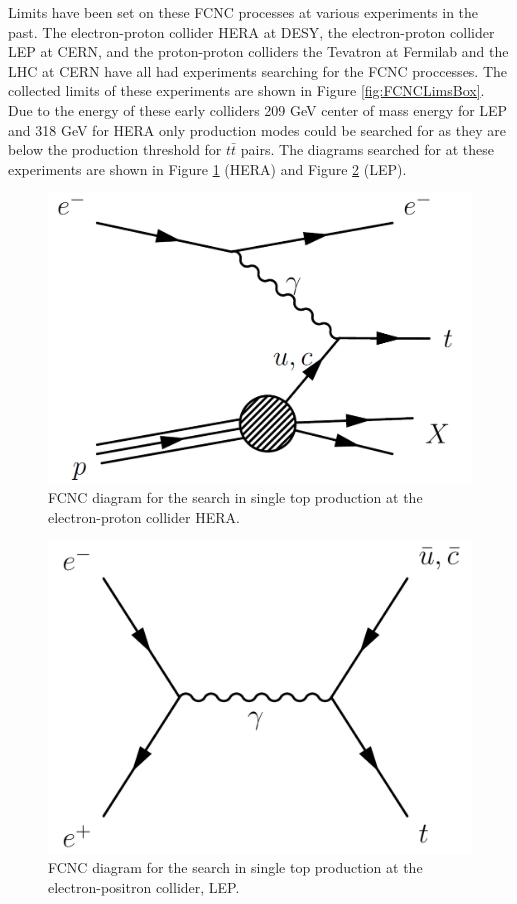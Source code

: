 Limits have been set on these FCNC processes at various experiments in the past.  The electron-proton collider HERA at DESY, the electron-proton collider LEP at CERN, and the proton-proton colliders the Tevatron at Fermilab and the LHC at CERN have all had experiments searching for the FCNC proccesses.  The collected limits of these experiments are shown in Figure \ref{fig:FCNCLimsBox}.  Due to the energy of these early colliders 209 GeV center of mass energy for LEP and 318 GeV for HERA only production modes could be searched for as they are below the production threshold for $t\bar{t}$ pairs. The diagrams searched for at these experiments are shown in Figure \ref{fig:fcncHera} (HERA) and Figure \ref{fig:fcncLep} (LEP).
\begin{figure}[h!]
	\centering
	\includegraphics[width=.4\columnwidth]{../ThesisImages/Theory/HeraFCNC.png}
	\caption{FCNC diagram for the search in single top production at the electron-proton collider HERA.}
	\label{fig:fcncHera}
\end{figure}
\begin{figure}[h!]
	\centering
	\includegraphics[width=.4\columnwidth]{../ThesisImages/Theory/LepFCNC.png}
	\caption{FCNC diagram for the search in single top production at the electron-positron collider, LEP.}
	\label{fig:fcncLep}
\end{figure}

